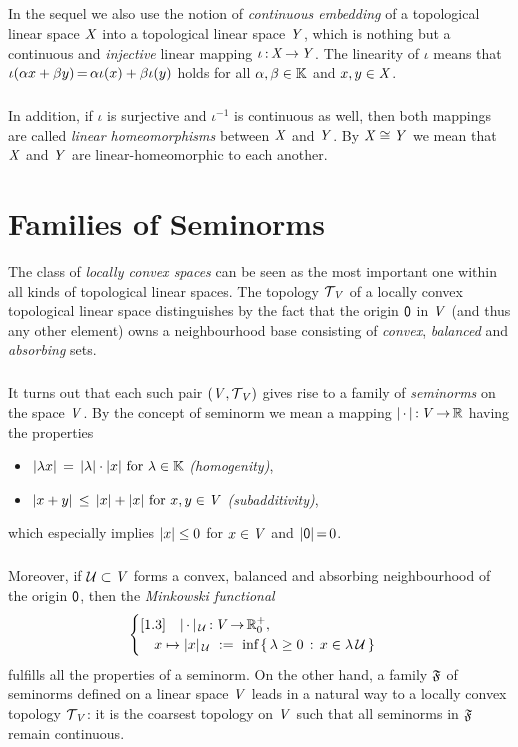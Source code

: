 \documentclass[11pt,twoside]{article}
\begin{document}
\subparagraph*{} %
In the sequel we also use the notion of \textit{continuous embedding}
of a topological linear space $\mathit{X}$ into a topological linear space $\mathit{Y}$,
which is nothing but a continuous and \textit{injective} linear mapping
$\iota{\,:\,}\mathit{X} {\,\to\,} \mathit{Y}$.
The linearity of $\iota$ means that 
$\iota(\alpha x + \beta y) {\,=\,} \alpha \iota(x) + \beta \iota(y)$ holds
for all $\alpha, \beta \in {\mathbb{K}}$ and $x,y \in \mathit{X}$.

\subparagraph*{} %
In addition,
if $\iota$ is surjective and $\iota^{-1}$ is continuous as well,
then both mappings are called \textit{linear homeomorphisms}
between $\mathit{X}$ and $\mathit{Y}$.
By $\mathit{X} \cong \mathit{Y}$ we mean
that $\mathit{X}$ and $\mathit{Y}$ are linear-homeomorphic to each another.

\section{Families of Seminorms}                                                %
The class of \textit{locally convex spaces} can be seen as the most important
one within all kinds of topological linear spaces.
The topology $\mathcal{T}_{\,\mathit{V}}$ of a locally convex topological linear space
distinguishes by the fact
that the origin ${\mathsf{0}}$ in $\mathit{V}$
(and thus any other element) owns a neighbourhood base
consisting of \textit{convex}, \textit{balanced} and \textit{absorbing} sets.

\subparagraph*{} %
It turns out
that each such pair $(\mathit{V},\mathcal{T}_{\,\mathit{V}})$ gives rise to
a family of \textit{seminorms} on the space $\mathit{V}$.
By the concept of seminorm
we mean a mapping $\abs{\,\cdot\,} \:\vecV \xto \R$ having the properties
\begin{itemize}[leftmargin=55pt,itemsep=2pt]
\item[(SN-1)] \quad
$\abs{\lambda x} \= \abs{\lambda} \cdot \abs{x} \for \lambda \in \F$
\textit{(homogenity)},
\item[(SN-2)] \quad
$\abs{x+y} \, \leq \, \abs{x} + \abs{x} \for x,y \in \vecV$
\textit{(subadditivity)},
\end{itemize}
which especially implies $\abs{x} \leq 0$ for $x \in \mathit{V}$
and $\abs{\0} \eq 0$.

\subparagraph*{} %
Moreover,
if $\mathcal{U} \subset \mathit{V}$ forms a convex, balanced and absorbing neighbourhood
of the origin ${\mathsf{0}}$,
then the \textit{Minkowski functional}
\[
\begin{cases}[1.3]
\quad \abs{\,\cdot\,} _{\,\U}\:\vecV \xto \R_0^+,\\
\quad x \mapsto \abs{x} _{\,\U} \, \eqdef \,
\mbox{inf} \, \set{\lambda \geq 0}{ x \in \lambda \, \U} \\
\end{cases}
\]
fulfills all the properties of a seminorm.
On the other hand,
a family $\mathfrak{F}$ of seminorms defined on a linear space $\mathit{V}$
leads in a natural way to a locally convex topology $\mathcal{T}_{\,\mathit{V}}$:
it is the coarsest topology on $\mathit{V}$
such that all seminorms in $\mathfrak{F}$ remain continuous.
\end{document}
